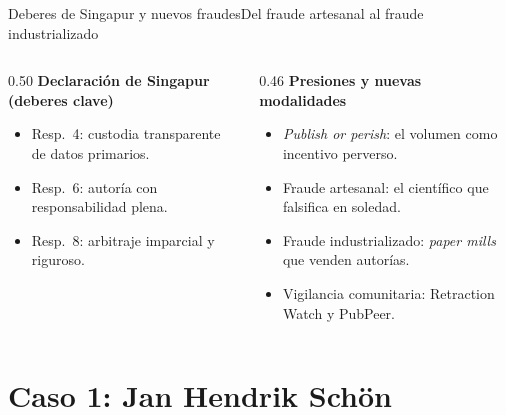 \documentclass[11pt,aspectratio=169,xcolor=table]{beamer}
\begin{document}
\begin{frame}{Deberes de Singapur y nuevos fraudes}{Del fraude artesanal al fraude industrializado}
  \begin{columns}[T,onlytextwidth]
    \begin{column}{0.50\textwidth}
      \textbf{Declaración de Singapur (deberes clave)}
      \begin{itemize}
        \item Resp.~4: custodia transparente de datos primarios.
        \item Resp.~6: autoría con responsabilidad plena.
        \item Resp.~8: arbitraje imparcial y riguroso.
      \end{itemize}
    \end{column}
    \begin{column}{0.46\textwidth}
      \textbf{Presiones y nuevas modalidades}
      \begin{itemize}
        \item \emph{Publish or perish}: el volumen como incentivo perverso.
        \item Fraude \alert{artesanal}: el científico que falsifica en soledad.
        \item Fraude \alert{industrializado}: \emph{paper mills} que venden autorías.
        \item Vigilancia comunitaria: Retraction Watch y PubPeer.
      \end{itemize}
    \end{column}
  \end{columns}
\end{frame}

\section{Caso 1: Jan Hendrik Schön}
\end{document}
